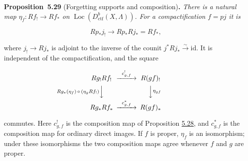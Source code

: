 \documentclass[11pt]{article}
\newenvironment{bpstatement}[2]{\par\addvspace{0.6\baselineskip}\noindent\textbf{#1}#2\textbf{.}\enspace\ignorespaces}
  {\par\addvspace{0.4\baselineskip}}
\newenvironment{bpstatementit}[2]{\begin{bpstatement}{#1}{#2}\itshape\ignorespaces}{\end{bpstatement}}
\providecommand{\Loc}{}\renewcommand{\Loc}{\operatorname{Loc}}
\begin{document}
\label{bp93}%
\begin{bpstatementit}{Proposition~5.29}{ (Forgetting supports and composition)}
There is a natural map \(\eta_f:Rf_!\to Rf_*\) on \(\Loc(D^b_{\mathrm{ctf}}(X,\Lambda))\). For a compactification \(f=pj\) it is

\[
Rp_*j_!\longrightarrow Rp_*Rj_*=Rf_*,
\]

where \(j_!\to Rj_*\) is adjoint to the inverse of the counit \(j^*Rj_*\xrightarrow{\sim}\mathrm{id}\). It is independent of the compactification, and the square

\[
\begin{CD}
Rg_!Rf_! @>{c^!_{g,f}}>> R(gf)_!\\
@V{Rg_*(\eta_f)\,\circ\,(\eta_g Rf_!)}VV @VV{\eta_{gf}}V\\
Rg_*Rf_* @>{c^*_{g,f}}>> R(gf)_*
\end{CD}
\]

commutes. Here \(c^!_{g,f}\) is the composition map of Proposition \hyperref[bp90]{5.28}, and \(c^*_{g,f}\) is the composition map for ordinary direct images. If \(f\) is proper, \(\eta_f\) is an isomorphism; under these isomorphisms the two composition maps agree whenever \(f\) and \(g\) are proper.
\end{bpstatementit}
\end{document}
